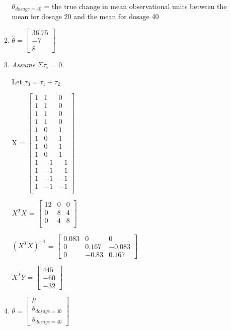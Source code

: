 \documentclass{article}\usepackage[]{graphicx}\usepackage[]{color}
\begin{document}
\begin{enumerate}
\begin{enumerate}
$\theta_{dosage = 40}$ = the true change in mean observational units between the mean for dosage 20 and the mean for dosage 40


\item %

$\hat{\theta} = \begin{bmatrix} 36.75\\
-7\\
8
\end{bmatrix}$

\item %
{\it Assume} $\Sigma \tau_{i}$ = 0.



Let $\tau_{3} = \tau_{1} + \tau_{2}$

X = $\begin{bmatrix}
 1 & 1 & 0\\
 1 & 1 & 0\\
 1 & 1 & 0\\
 1 & 1 & 0\\
 1 & 0 & 1\\
 1 & 0 & 1\\
 1 & 0 & 1\\
 1 & 0 & 1\\
 1 & -1 & -1\\
 1 & -1 & -1\\
 1 & -1 & -1\\
 1 & -1 & -1\\
 \end{bmatrix}$
 
 $X^{T}X$ = $\begin{bmatrix}
 12 & 0 & 0\\
 0 & 8 & 4\\
 0 & 4 & 8\\
 \end{bmatrix}$
 
 $(X^{T}X)^{-1}$ = $\begin{bmatrix}
 0.083 & 0 & 0\\
 0 & 0.167 & -0.083\\
 0 & -0.83 & 0.167
 \end{bmatrix}$
 
 $X^{T}Y$ = $\begin{bmatrix}
 445\\
 -60\\
 -32
 \end{bmatrix}$
 
\item

$\theta = \begin{bmatrix}
\mu\\
\theta_{dosage=30}\\
\theta_{dosage=40}
\end{bmatrix}$


\end{enumerate}
\end{enumerate}
\end{document}
